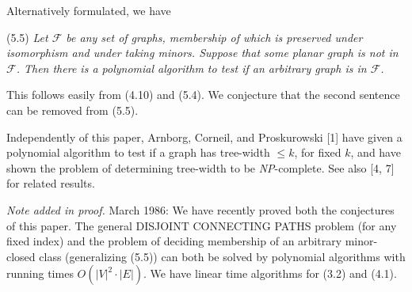Alternatively formulated, we have

\stmt
(5.5) \textit{Let $\mathscr{F}$ be any set of graphs, membership of which is preserved under isomorphism and under taking minors. Suppose that some planar graph is not in $\mathscr{F}$. Then there is a polynomial algorithm to test if an arbitrary graph is in $\mathscr{F}$.}

This follows easily from (4.10) and (5.4). We conjecture that the second sentence can be removed from (5.5).

Independently of this paper, Arnborg, Corneil, and Proskurowski [1] have given a polynomial algorithm to test if a graph has tree-width $\le k$, for fixed $k$, and have shown the problem of determining tree-width to be \textit{NP}-complete. See also [4, 7] for related results.

{\textit{Note added in proof.} March 1986: We have recently proved both the conjectures of this paper. The general DISJOINT CONNECTING PATHS problem (for any fixed index) and the problem of deciding membership of an arbitrary minor-closed class (generalizing (5.5)) can both be solved by polynomial algorithms with running times $O(|V|^2 \cdot |E|)$. We have linear time algorithms for (3.2) and (4.1).\par}
